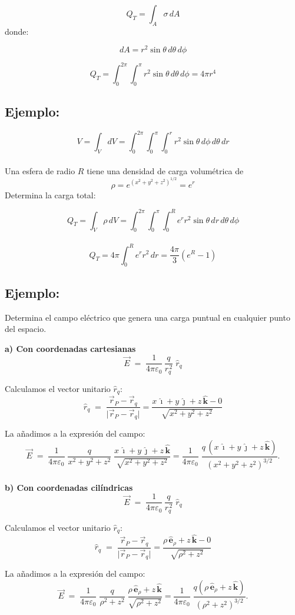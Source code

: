 \documentclass[a4paper,12pt]{article}
\begin{document}
\[
Q_T = \int_{A} \sigma\, dA
\]
donde:

\[
dA = r^{2}\sin\theta\, d\theta\, d\phi
\]

\[
Q_T = \int_{0}^{2\pi}\int_{0}^{\pi} r^{2}\sin\theta\, d\theta\, d\phi = 4\pi r^{4}
\]
\subsection*{Ejemplo:}
\[
V = \int_{V} dV = \int_{0}^{2\pi}\int_{0}^{\pi}\int_{0}^{r} r^{2}\sin\theta\, d\phi\, d\theta\, dr
\]\\
Una esfera de radio $R$ tiene una densidad de carga volumétrica de 
\[
\rho = e^{(x^{2}+y^{2}+z^{2})^{1/2}} = e^{r}
\]
Determina la carga total:

\[
Q_T = \int_{V} \rho\, dV = \int_{0}^{2\pi}\int_{0}^{\pi}\int_{0}^{R} e^{r} r^{2}\sin\theta\, dr\, d\theta\, d\phi
\]\\
\[
Q_T = 4\pi \int_{0}^{R} e^{r} r^{2}\, dr = \frac{4\pi}{3}\left(e^{R} - 1\right)
\]
\newpage
\noindent
\subsection*{Ejemplo:}
\noindent 
Determina el campo eléctrico que genera una carga puntual en cualquier punto del espacio.

\textbf{a) Con coordenadas cartesianas}
\[
\vec E \;=\; \frac{1}{4\pi\varepsilon_0}\,\frac{q}{r_q^{\,2}}\;\hat r_q
\]

Calculamos el vector unitario $\hat r_q$:
\[
\hat r_q \;=\; \frac{\vec r_P-\vec r_q}{\lvert \vec r_P-\vec r_q\rvert}
= \frac{x\,\hat{\imath}+y\,\hat{\jmath}+z\,\hat{\mathbf k}-0}{\sqrt{x^{2}+y^{2}+z^{2}}}
\]

La añadimos a la expresión del campo:
\[
\vec E \;=\; \frac{1}{4\pi\varepsilon_0}\;
\frac{q}{x^{2}+y^{2}+z^{2}}\;
\frac{x\,\hat{\imath}+y\,\hat{\jmath}+z\,\hat{\mathbf k}}{\sqrt{x^{2}+y^{2}+z^{2}}}
= \frac{1}{4\pi\varepsilon_0}\;
\frac{q\,(x\,\hat{\imath}+y\,\hat{\jmath}+z\,\hat{\mathbf k})}{(x^{2}+y^{2}+z^{2})^{3/2}}.
\]\\

\textbf{b) Con coordenadas cilíndricas}
\[
\vec E \;=\; \frac{1}{4\pi\varepsilon_0}\,\frac{q}{r_q^{\,2}}\;\hat r_q
\]

Calculamos el vector unitario $\hat r_q$:
\[
\hat r_q \;=\; \frac{\vec r_P-\vec r_q}{\lvert \vec r_P-\vec r_q\rvert}
= \frac{\rho\,\hat{\mathbf e}_\rho + z\,\hat{\mathbf k}-0}{\sqrt{\rho^{2}+z^{2}}}
\]

La añadimos a la expresión del campo:
\[
\vec E \;=\; \frac{1}{4\pi\varepsilon_0}\;
\frac{q}{\rho^{2}+z^{2}}\;
\frac{\rho\,\hat{\mathbf e}_\rho + z\,\hat{\mathbf k}}{\sqrt{\rho^{2}+z^{2}}}
= \frac{1}{4\pi\varepsilon_0}\;
\frac{q\left(\rho\,\hat{\mathbf e}_\rho + z\,\hat{\mathbf k}\right)}{(\rho^{2}+z^{2})^{3/2}}.
\]\\
\end{document}
